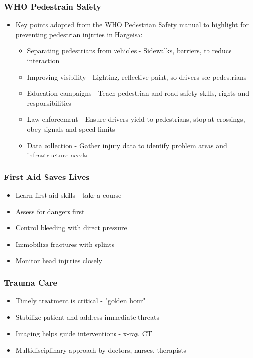 \documentclass{beamer}
\begin{document}
\begin{frame}
\frametitle{WHO Pedestrain Safety}
    \begin{itemize}
        \item Key points adopted from the WHO Pedestrian Safety manual to highlight for preventing pedestrian injuries in Hargeisa:
        \begin{itemize}
            \item Separating pedestrians from vehicles - Sidewalks, barriers, to reduce interaction
            \item Improving visibility - Lighting, reflective paint, so drivers see pedestrians
            \item Education campaigns - Teach pedestrian and road safety skills, rights and responsibilities
            \item Law enforcement - Ensure drivers yield to pedestrians, stop at crossings, obey signals and speed limits
            \item Data collection - Gather injury data to identify problem areas and infrastructure needs
        \end{itemize}

    \end{itemize}
\end{frame}

\begin{frame}
\frametitle{First Aid Saves Lives}
\begin{itemize}
\item Learn first aid skills - take a course
\item Assess for dangers first
\item Control bleeding with direct pressure  
\item Immobilize fractures with splints
\item Monitor head injuries closely 
\end{itemize}
\end{frame}

\clearpage

\begin{frame}
\frametitle{Trauma Care}
\begin{itemize}
\item Timely treatment is critical - "golden hour"
\item Stabilize patient and address immediate threats
\item Imaging helps guide interventions - x-ray, CT
\item Multidisciplinary approach by doctors, nurses, therapists
\end{itemize}  
\end{frame}
\end{document}
